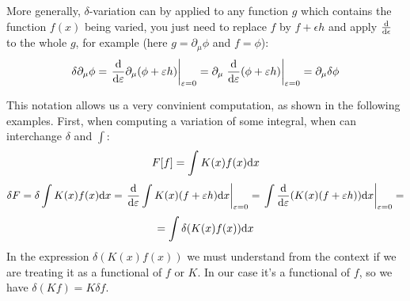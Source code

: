 More generally, $\delta$-variation can by applied to any function $g$ which contains the function $f(x)$ being varied, you just need to replace $f$ by $f+\epsilon h$ and apply ${{\rm d}\over{\rm d}\epsilon}$ to the whole $g$, for example (here $g=\partial_\mu\phi$ and $f=\phi$): 
\begin{equation*}
  \delta\partial_\mu\phi=\left.{{\rm d}\over{\rm d}\varepsilon}\partial_\mu(\phi+\varepsilon h) \right|_{\varepsilon=0}= \partial_\mu\left.{{\rm d}\over{\rm d}\varepsilon}(\phi+\varepsilon h) \right|_{\varepsilon=0}=\partial_\mu\delta\phi
\end{equation*}

This notation allows us a very convinient computation, as shown in the following examples. First, when computing a variation of some integral, when can interchange $\delta$ and $\int$: 
\begin{equation*}
  F[f]=\int K(x) f(x) {\rm d} x
\end{equation*}
\begin{equation*}
  \delta F=\delta \int K(x) f(x) {\rm d} x = \left.{{\rm d}\over{\rm d}\varepsilon}\int K(x) (f+\varepsilon h){\rm d} x\right|_{\varepsilon=0}= \left.\int{{\rm d}\over{\rm d}\varepsilon} (K(x) (f+\varepsilon h)){\rm d} x\right|_{\varepsilon=0}=
\end{equation*}
\begin{equation*}
  =\int\delta(K(x) f(x)){\rm d} x
\end{equation*}
In the expression $\delta(K(x) f(x))$ we must understand from the context if we are treating it as a functional of $f$ or $K$. In our case it's a functional of $f$, so we have $\delta(K f)=K\delta f$.

